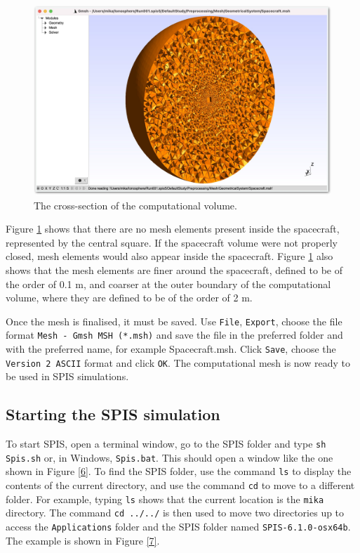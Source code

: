 \documentclass[a4paper, 12pt]{article}
\begin{document}
\begin{figure}[!ht]
    \centering
    \includegraphics[width=1\textwidth]{fig5.jpg}
    \caption{The cross-section of the computational volume.}
    \label{5}
\end{figure}

Figure \ref{5} shows that there are no mesh elements present inside the spacecraft, represented by the central square. If the spacecraft volume were not properly closed, mesh elements would also appear inside the spacecraft. Figure \ref{5} also shows that the mesh elements are finer around the spacecraft, defined to be of the order of 0.1 m, and coarser at the outer boundary of the computational volume, where they are defined to be of the order of 2 m.\par
Once the mesh is finalised, it must be saved. Use \verb|File|, \verb|Export|, choose the file format \verb|Mesh - Gmsh MSH (*.msh)| and save the file in the preferred folder and with the preferred name, for example Spacecraft.msh. Click \verb|Save|, choose the \verb|Version 2 ASCII| format and click \verb|OK|. The computational mesh is now ready to be used in SPIS simulations.

\subsection{Starting the SPIS simulation}
\vspace{2mm}

To start SPIS, open a terminal window, go to the SPIS folder and type \verb|sh Spis.sh| or, in Windows, \verb|Spis.bat|. This should open a window like the one shown in Figure \ref{6}. To find the SPIS folder, use the command \verb|ls| to display the contents of the current directory, and use the command \verb|cd| to move to a different folder. For example, typing \verb|ls| shows that the current location is the \verb|mika| directory. The command \verb|cd ../../| is then used to move two directories up to access the \verb|Applications| folder and the SPIS folder named \verb|SPIS-6.1.0-osx64b|. The example is shown in Figure \ref{7}.\\
\end{document}
